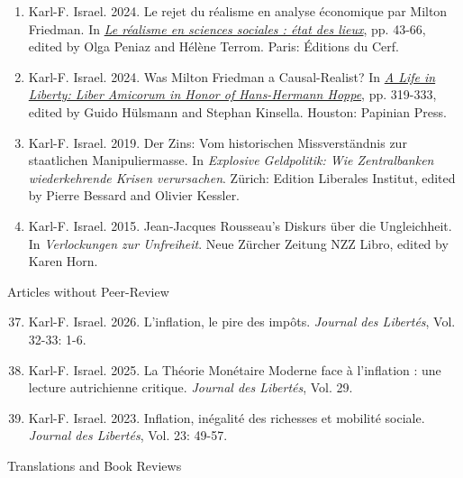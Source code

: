 \documentclass[11pt]{article}
\begin{document}
\begin{enumerate}
    \item Karl-F. Israel. 2024. Le rejet du réalisme en analyse économique par Milton Friedman. In \href{https://www.editionsducerf.fr/librairie/livre/20748/Le-realisme-en-sciences-sociales-etat-des-lieux#:~:text=L'approche%20réaliste%20d'Aristote,formelles%2C%20effi%20cientes%20et%20matérielles.&text=l'économie%20classique%20par%20l'économétrie.}{\textit{Le réalisme en sciences sociales : état des lieux}}, pp. 43-66, edited by Olga Peniaz and Hélène Terrom. Paris: Éditions du Cerf.  
    \item Karl-F. Israel. 2024. Was Milton Friedman a Causal-Realist? In \href{https://www.stephankinsella.com/wp-content/uploads/publications/hoppe-life-in-liberty-corrections-2024-11-05.pdf}{\textit{A Life in Liberty: Liber Amicorum in Honor of Hans-Hermann Hoppe}}, pp. 319-333, edited by Guido Hülsmann and Stephan Kinsella. Houston: Papinian Press. 
    \item Karl-F. Israel. 2019. Der Zins: Vom historischen Missverständnis zur staatlichen Manipuliermasse. In \textit{Explosive Geldpolitik: Wie Zentralbanken wiederkehrende Krisen verursachen}. Zürich: Edition Liberales Institut, edited by Pierre Bessard and Olivier Kessler.
    \item Karl-F. Israel. 2015. Jean-Jacques Rousseau's Diskurs über die Ungleichheit. In \textit{Verlockungen zur Unfreiheit}. Neue Zürcher Zeitung NZZ Libro, edited by Karen Horn.
\end{enumerate}

\begin{center}
    Articles without Peer-Review
\end{center}

\begin{enumerate}
\setcounter{enumi}{36}
    \item Karl-F. Israel. 2026. L’inflation, le pire des impôts. \textit{Journal des Libertés}, Vol. 32-33: 1-6.
    \item Karl-F. Israel. 2025. La Théorie Monétaire Moderne face à l’inflation : une lecture autrichienne critique. \textit{Journal des Libertés}, Vol. 29.
    \item Karl-F. Israel. 2023. Inflation, inégalité des richesses et mobilité sociale. \textit{Journal des Libertés}, Vol. 23: 49-57.
\end{enumerate}

\begin{center}
    Translations and Book Reviews
\end{center}
\end{document}
